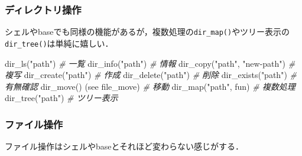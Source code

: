 \documentclass[
]{article}
\newenvironment{Shaded}{\begin{snugshade}}{\end{snugshade}}
\newcommand{\CommentTok}[1]{\textcolor[rgb]{0.56,0.35,0.01}{\textit{#1}}}
\newcommand{\FunctionTok}[1]{\textcolor[rgb]{0.00,0.00,0.00}{#1}}
\newcommand{\NormalTok}[1]{#1}
\newcommand{\StringTok}[1]{\textcolor[rgb]{0.31,0.60,0.02}{#1}}
\begin{document}
\hypertarget{ux30c7ux30a3ux30ecux30afux30c8ux30eaux64cdux4f5c}{%
\subsubsection{ディレクトリ操作}\label{ux30c7ux30a3ux30ecux30afux30c8ux30eaux64cdux4f5c}}

シェルやbaseでも同様の機能があるが，複数処理の\texttt{dir\_map()}やツリー表示の\texttt{dir\_tree()}は単純に嬉しい．

\begin{Shaded}
\begin{Highlighting}[]
\FunctionTok{dir\_ls}\NormalTok{(}\StringTok{"path"}\NormalTok{)               }\CommentTok{\# 一覧   }
\FunctionTok{dir\_info}\NormalTok{(}\StringTok{"path"}\NormalTok{)             }\CommentTok{\# 情報   }
\FunctionTok{dir\_copy}\NormalTok{(}\StringTok{"path"}\NormalTok{, }\StringTok{"new{-}path"}\NormalTok{) }\CommentTok{\# 複写   }
\FunctionTok{dir\_create}\NormalTok{(}\StringTok{"path"}\NormalTok{)           }\CommentTok{\# 作成   }
\FunctionTok{dir\_delete}\NormalTok{(}\StringTok{"path"}\NormalTok{)           }\CommentTok{\# 削除   }
\FunctionTok{dir\_exists}\NormalTok{(}\StringTok{"path"}\NormalTok{)           }\CommentTok{\# 有無確認   }
\FunctionTok{dir\_move}\NormalTok{() (see file\_move)   }\CommentTok{\# 移動   }
\FunctionTok{dir\_map}\NormalTok{(}\StringTok{"path"}\NormalTok{, fun)         }\CommentTok{\# 複数処理   }
\FunctionTok{dir\_tree}\NormalTok{(}\StringTok{"path"}\NormalTok{)             }\CommentTok{\# ツリー表示   }
\end{Highlighting}
\end{Shaded}

\hypertarget{ux30d5ux30a1ux30a4ux30ebux64cdux4f5c}{%
\subsubsection{ファイル操作}\label{ux30d5ux30a1ux30a4ux30ebux64cdux4f5c}}

ファイル操作はシェルやbaseとそれほど変わらない感じがする．
\end{document}
